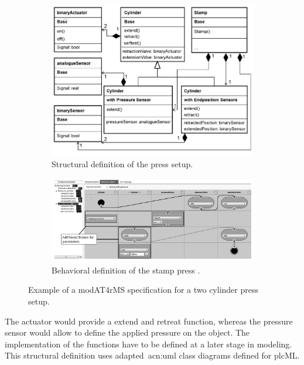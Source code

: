 \begin{figure}
	\begin{subfigure}{\textwidth}
		\includegraphics[width=\textwidth]{./Figures/modAT4rMS_struct.png}
		\caption{Structural definition of the press setup.}
		\label{fig:modAT_struct}
	\end{subfigure}
	\begin{subfigure}{\textwidth}
		\includegraphics[width=\textwidth]{./Figures/modAT4rMS_beh.png}
		\caption{Behavioral definition of the stamp press .}
		\label{fig:modAT_beh}
	\end{subfigure}
	\caption[Example of a modAT4rMS specification for a two cylinder press setup.]{Example of a modAT4rMS specification for a two cylinder press setup.~\cite{Obermeier:2015aa}}
	\label{fig:modAT}
\end{figure}
The actuator would provide a extend and retreat function, whereas the pressure sensor would allow to define the applied pressure on the object.
The implementation of the functions have to be defined at a later stage in modeling.
This structural definition uses adapted~\acrshort{acn:uml} class diagrams defined for plcML.
